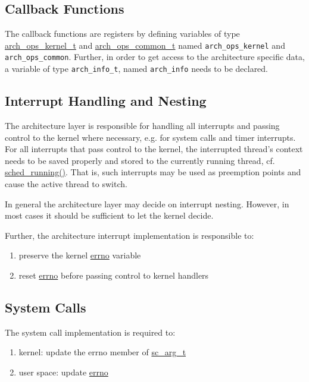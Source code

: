 	\subsection{Callback Functions}
		The callback functions are registers by defining variables of type \hyperref[structarch__ops__kernel__t]{arch\_ops\_kernel\_t} and \hyperref[structarch__ops__common__t]{arch\_ops\_common\_t} named \lstinline{arch_ops_kernel} and \lstinline{arch_ops_common}. Further, in order to get access to the architecture specific data, a variable of type \lstinline{arch_info_t}, named \lstinline{arch_info} needs to be declared.

	\subsection{Interrupt Handling and Nesting}
		The architecture layer is responsible for handling all interrupts and passing control to the kernel where necessary, e.g. for system calls and timer interrupts. For all interrupts that pass control to the kernel, the interrupted thread's context needs to be saved properly and stored to the currently running thread, cf. \hyperref[kernel_2sched_8c_a34a33397e7197f803feffb423ce6717a]{sched\_running()}. That is, such interrupts may be used as preemption points and cause the active thread to switch.

		In general the architecture layer may decide on interrupt nesting. However, in most cases it should be sufficient to let the kernel decide.

		Further, the architecture interrupt implementation is responsible to:
		\begin{enumerate}
			\item preserve the kernel \hyperref[errno_8h_ad65a8842cc674e3ddf69355898c0ecbf]{errno} variable
			\item reset \hyperref[errno_8h_ad65a8842cc674e3ddf69355898c0ecbf]{errno} before passing control to kernel handlers
		\end{enumerate}

	\subsection{System Calls}
		The system call implementation is required to:
		\begin{enumerate}
			\item kernel: update the errno member of \hyperref[sys_2syscall_8h_structsc__arg__t]{sc\_arg\_t}
			\item user space: update \hyperref[errno_8h_ad65a8842cc674e3ddf69355898c0ecbf]{errno}
		\end{enumerate}

